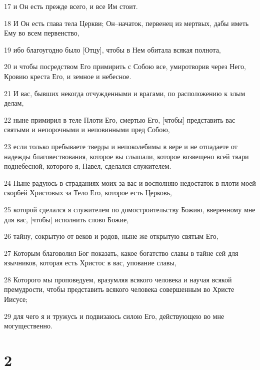 \par 17 и Он есть прежде всего, и все Им стоит.
\par 18 И Он есть глава тела Церкви; Он--начаток, первенец из мертвых, дабы иметь Ему во всем первенство,
\par 19 ибо благоугодно было [Отцу], чтобы в Нем обитала всякая полнота,
\par 20 и чтобы посредством Его примирить с Собою все, умиротворив через Него, Кровию креста Его, и земное и небесное.
\par 21 И вас, бывших некогда отчужденными и врагами, по расположению к злым делам,
\par 22 ныне примирил в теле Плоти Его, смертью Его, [чтобы] представить вас святыми и непорочными и неповинными пред Собою,
\par 23 если только пребываете тверды и непоколебимы в вере и не отпадаете от надежды благовествования, которое вы слышали, которое возвещено всей твари поднебесной, которого я, Павел, сделался служителем.
\par 24 Ныне радуюсь в страданиях моих за вас и восполняю недостаток в плоти моей скорбей Христовых за Тело Его, которое есть Церковь,
\par 25 которой сделался я служителем по домостроительству Божию, вверенному мне для вас, [чтобы] исполнить слово Божие,
\par 26 тайну, сокрытую от веков и родов, ныне же открытую святым Его,
\par 27 Которым благоволил Бог показать, какое богатство славы в тайне сей для язычников, которая есть Христос в вас, упование славы,
\par 28 Которого мы проповедуем, вразумляя всякого человека и научая всякой премудрости, чтобы представить всякого человека совершенным во Христе Иисусе;
\par 29 для чего я и тружусь и подвизаюсь силою Его, действующею во мне могущественно.

\chapter{2}

